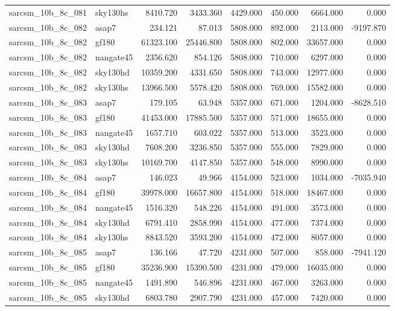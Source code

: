 \begin{tabular}{llrrrrrr}
sarcsm\_10b\_8c\_081 & sky130hs & 8410.720 & 3433.360 & 4429.000 & 450.000 & 6664.000 & 0.000 \\
sarcsm\_10b\_8c\_082 & asap7 & 234.121 & 87.013 & 5808.000 & 892.000 & 2113.000 & -9197.870 \\
sarcsm\_10b\_8c\_082 & gf180 & 61323.100 & 25446.800 & 5808.000 & 802.000 & 33657.000 & 0.000 \\
sarcsm\_10b\_8c\_082 & nangate45 & 2356.620 & 854.126 & 5808.000 & 710.000 & 6297.000 & 0.000 \\
sarcsm\_10b\_8c\_082 & sky130hd & 10359.200 & 4331.650 & 5808.000 & 743.000 & 12977.000 & 0.000 \\
sarcsm\_10b\_8c\_082 & sky130hs & 13966.500 & 5578.420 & 5808.000 & 769.000 & 15582.000 & 0.000 \\
sarcsm\_10b\_8c\_083 & asap7 & 179.105 & 63.948 & 5357.000 & 671.000 & 1204.000 & -8628.510 \\
sarcsm\_10b\_8c\_083 & gf180 & 41453.000 & 17885.500 & 5357.000 & 571.000 & 18655.000 & 0.000 \\
sarcsm\_10b\_8c\_083 & nangate45 & 1657.710 & 603.022 & 5357.000 & 513.000 & 3523.000 & 0.000 \\
sarcsm\_10b\_8c\_083 & sky130hd & 7608.200 & 3236.850 & 5357.000 & 555.000 & 7829.000 & 0.000 \\
sarcsm\_10b\_8c\_083 & sky130hs & 10169.700 & 4147.850 & 5357.000 & 548.000 & 8990.000 & 0.000 \\
sarcsm\_10b\_8c\_084 & asap7 & 146.023 & 49.966 & 4154.000 & 523.000 & 1034.000 & -7035.940 \\
sarcsm\_10b\_8c\_084 & gf180 & 39978.000 & 16657.800 & 4154.000 & 518.000 & 18467.000 & 0.000 \\
sarcsm\_10b\_8c\_084 & nangate45 & 1516.320 & 548.226 & 4154.000 & 491.000 & 3573.000 & 0.000 \\
sarcsm\_10b\_8c\_084 & sky130hd & 6791.410 & 2858.990 & 4154.000 & 477.000 & 7374.000 & 0.000 \\
sarcsm\_10b\_8c\_084 & sky130hs & 8843.520 & 3593.200 & 4154.000 & 472.000 & 8057.000 & 0.000 \\
sarcsm\_10b\_8c\_085 & asap7 & 136.166 & 47.720 & 4231.000 & 507.000 & 858.000 & -7941.120 \\
sarcsm\_10b\_8c\_085 & gf180 & 35236.900 & 15390.500 & 4231.000 & 479.000 & 16035.000 & 0.000 \\
sarcsm\_10b\_8c\_085 & nangate45 & 1491.890 & 546.896 & 4231.000 & 467.000 & 3263.000 & 0.000 \\
sarcsm\_10b\_8c\_085 & sky130hd & 6803.780 & 2907.790 & 4231.000 & 457.000 & 7420.000 & 0.000 \\

\end{tabular}

